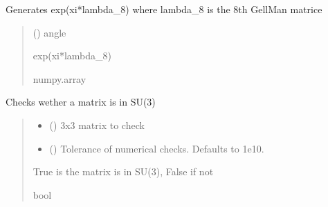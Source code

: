 \documentclass[letterpaper,10pt,english]{sphinxmanual}
\begin{document}

\begin{fulllineitems}
\label{\detokenize{gauge_su3:gauge_su3.el_8}}
\pysigstartsignatures
\pysiglinewithargsret
{}
{}
{}
\pysigstopsignatures
\sphinxAtStartPar
Generates exp(xi*lambda\_8) where lambda\_8 is the 8th Gell\sphinxhyphen{}Man matrice
\begin{quote}\begin{description}
\sphinxAtStartPar
{} () \textendash{} angle

\sphinxAtStartPar
exp(xi*lambda\_8)

\sphinxAtStartPar
numpy.array

\end{description}\end{quote}

\end{fulllineitems}


\begin{fulllineitems}
\label{\detokenize{gauge_su3:gauge_su3.est_SU3}}
\pysigstartsignatures
\pysiglinewithargsret
{}
{\sphinxparamcomma {}}
{}
\pysigstopsignatures
\sphinxAtStartPar
Checks wether a matrix is in SU(3)
\begin{quote}\begin{description}
\begin{itemize}
\item {} 
\sphinxAtStartPar
{} () \textendash{} 3x3 matrix to check

\item {} 
\sphinxAtStartPar
{} (\sphinxstyleliteralemphasis{\sphinxupquote{, }}) \textendash{} Tolerance of numerical checks. Defaults to 1e\sphinxhyphen{}10.

\end{itemize}

\sphinxAtStartPar
True is the matrix is in SU(3), False if not

\sphinxAtStartPar
bool

\end{description}\end{quote}

\end{fulllineitems}
\end{document}
